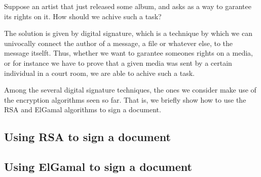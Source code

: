 \documentclass{subfiles}
\begin{document}
    Suppose an artist that just released some album,
        and asks as a way to garantee its rights on it.
        How should we achive such a task?

    The solution is given by digital signature,
        which is a technique by which we can univocally connect the author of a message,
        a file or whatever else, to the message itselft.
        Thus, whether we want to garantee someones rights on a media, 
        or for instance we have to prove that a given media was sent by a certain individual in a court room,
        we are able to achive such a task.

    Among the several digital signature techniques,
        the ones we consider make use of the encryption algorithms seen so far.
        That is, we briefly show how to use the RSA and ElGamal algorithms to sign a document.

    \subsection{Using RSA to sign a document}
    


    \subsection{Using ElGamal to sign a document}
    
\end{document}
